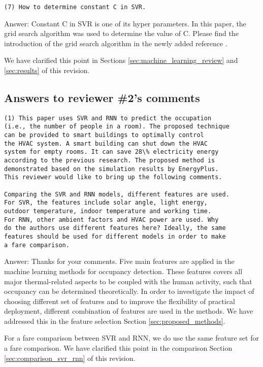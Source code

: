 \begin{verbatim}
(7) How to determine constant C in SVR.
\end{verbatim}
Answer: Constant C in SVR is one of its hyper parameters. In this paper, the grid search algorithm
was used to determine the value of C. Please find the introduction of the grid search algorithm in the
newly added reference \cite{Hsu2003}.

We have clarified this point in Sections
\ref{sec:machine_learning_review} and \ref{sec:results} of this
revision.

\subsection{Answers to reviewer \#2's comments}
\begin{verbatim}
(1) This paper uses SVR and RNN to predict the occupation
(i.e., the number of people in a room). The proposed technique
can be provided to smart buildings to optimally control
the HVAC system. A smart building can shut down the HVAC
system for empty rooms. It can save 28\% electricity energy
according to the previous research. The proposed method is
demonstrated based on the simulation results by EnergyPlus.
This reviewer would like to bring up the following comments.

Comparing the SVR and RNN models, different features are used.
For SVR, the features include solar angle, light energy,
outdoor temperature, indoor temperature and working time.
For RNN, other ambient factors and HVAC power are used. Why
do the authors use different features here? Ideally, the same
features should be used for different models in order to make
a fare comparison.
\end{verbatim}

Answer: Thanks for your comments. Five main features are applied in
the machine learning methods for occupancy detection.  These features
covers all major thermal-related aspects to be coupled with the human
activity, such that occupancy can be determined theoretically. In
order to investigate the impact of choosing different set of features
and to improve the flexibility of practical deployment, different
combination of features are used in the methods. We have addressed
this in the feature selection Section \ref{sec:proposed_methods}.

For a fare comparison between SVR and RNN, we do use the same feature
set for a fare comparison. We have clarified this point in the
comparison Section \ref{sec:comparison_svr_rnn} of this revision.

